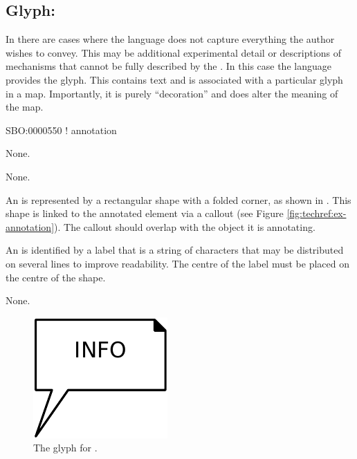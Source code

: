 \subsection{Glyph: }
\label{sec:annotation}

In \SBGNPDLone there are cases where the language does not capture everything the author wishes to convey.
This may be additional experimental detail or descriptions of mechanisms that cannot be fully described by the \PDl.
In this case the language provides the  glyph. This contains text and is associated with a particular glyph in a map.
Importantly, it is purely ``decoration'' and does alter the meaning of the map.

\begin{glyphDescription}

\glyphSboTerm
SBO:0000550 ! annotation

\glyphIncoming
None.

\glyphOutgoing
None.

\glyphContainer
An  is represented by a rectangular shape with a folded corner, as shown in .
This shape is linked to the annotated element via a callout (see Figure \ref{fig:techref:ex-annotation}).
The callout should overlap with the object it is annotating.

\glyphLabel
An  is identified by a label that is  a string of characters that may be distributed on several lines to improve readability.
The centre of the label must be placed on the centre of the shape.

\glyphAux
None.

\end{glyphDescription}

\begin{figure}[htb]
  \centering
  \includegraphics{images/build/annotation.pdf}
  \caption{The \PD glyph for .}
  \label{fig:techref:annotation}
\end{figure}

